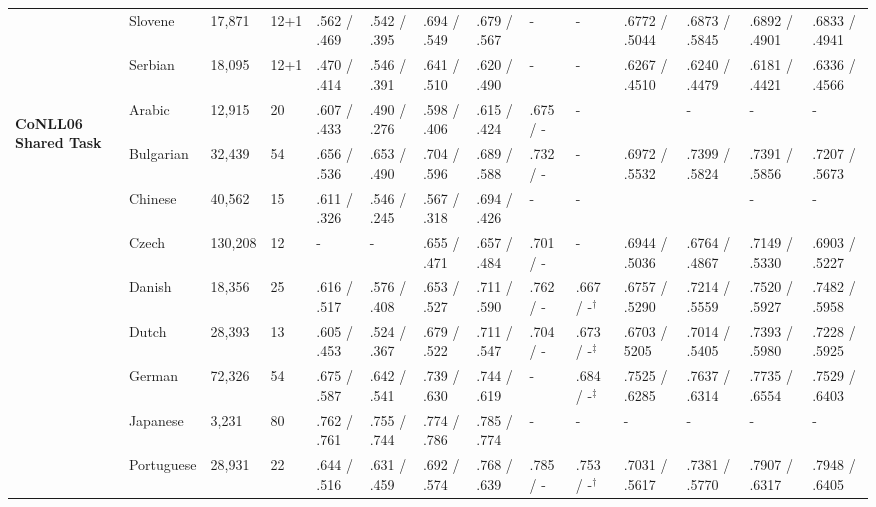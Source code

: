 \begin{landscape}
\begin{table}[ht]
\begin{tabular}{|l|l|l|l|p{1.5cm}|p{1.5cm}|p{1.5cm}|p{1.5cm}|p{1.5cm}|p{2cm}|p{2cm}|p{2cm}|p{2cm}|p{2cm}|}
        & Slovene    & 17,871  & 12+1 & .562 / .469   & .542 / .395   & .694 / .549   & .679 / .567   & -           & - & .6772 / .5044 & .6873 / .5845 & .6892 / .4901     & .6833 / .4941 \\
        & Serbian    & 18,095  & 12+1 & .470 / .414   & .546 / .391   & .641 / .510   & .620 / .490   & -           & - & .6267 / .4510 & .6240 / .4479 & .6181 / .4421     & .6336 / .4566 \\
        \hline %
        \multirow{13}{*}{\begin{sideways}\textbf{CoNLL06 Shared Task}\end{sideways}}
        & Arabic     & 12,915  & 20   & .607 / .433   & .490 / .276   & .598 / .406   & .615 / .424   & .675 / -    & -   & & - & -               & -  \\
        & Bulgarian  & 32,439  & 54   & .656 / .536   & .653 / .490   & .704 / .596   & .689 / .588   & .732 / -    & -   & .6972 / .5532 & .7399 / .5824 & .7391 / .5856     & .7207 / .5673 \\
        & Chinese    & 40,562  & 15   & .611 / .326   & .546 / .245   & .567 / .318   & .694 / .426   & -           & -   & & & -               & -           \\
        & Czech      & 130,208 & 12   & -             & -            & .655 / .471   & .657 / .484    & .701 / -    & -   & .6944 / .5036 & .6764 / .4867 & .7149 / .5330     & .6903 / .5227 \\
        & Danish     & 18,356  & 25   & .616 / .517   & .576 / .408   & .653 / .527   & .711 / .590   & .762 / -    & .667 / -$^\dagger$& .6757 / .5290 & .7214 / .5559  & .7520 / .5927     & .7482 / .5958 \\
        & Dutch      & 28,393  & 13   & .605 / .453   & .524 / .367   & .679 / .522   & .711 / .547   & .704 / -    & .673 / -$^\ddagger$& .6703 / 5205 & .7014 / .5405  & .7393 / .5980     & .7228 / .5925 \\
        & German     & 72,326  & 54   & .675 / .587   & .642 / .541   & .739 / .630   & .744 / .619   & -           & .684 / -$^\ddagger$& .7525 / .6285 & .7637 / .6314  & .7735 / .6554     & .7529 / .6403 \\
        & Japanese   & 3,231   & 80   & .762 / .761   & .755 / .744   & .774 / .786   & .785 / .774   & -           & -   & - & - & -               & -           \\
        & Portuguese & 28,931  & 22   & .644 / .516   & .631 / .459   & .692 / .574   & .768 / .639   & .785 / -    & .753 / -$^\dagger$& .7031 / .5617 & .7381 / .5770  & .7907 / .6317     & .7948 / .6405 \\

\end{tabular}
\end{table}
\end{landscape}
